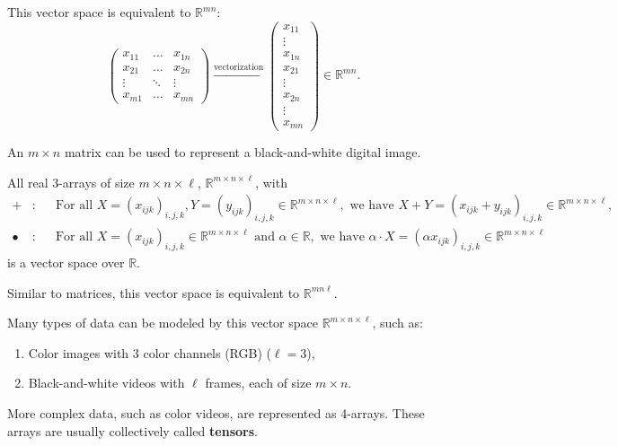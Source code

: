 \documentclass{huhtakm-template-book-v2}
\begin{document}
    \begin{rem}
        This vector space is equivalent to $\mathbb{R}^{mn}$:
        \begin{equation*}
            \begin{pmatrix}
                x_{11} & \hdots & x_{1n}\\
                x_{21} & \hdots & x_{2n}\\
                \vdots & \ddots & \vdots\\
                x_{m1} & \hdots & x_{mn}
            \end{pmatrix} \xrightarrow{\text{vectorization}} \begin{pmatrix}
                x_{11}\\\vdots\\x_{1n}\\x_{21}\\\vdots\\x_{2n}\\\vdots\\x_{mn}
            \end{pmatrix} \in \mathbb{R}^{mn}.
        \end{equation*}
    \end{rem}
    \begin{rem}
        An $m \times n$ matrix can be used to represent a black-and-white digital image.
    \end{rem}
    \begin{eg}
        All real 3-arrays of size $m \times n \times \ell$, $\mathbb{R}^{m \times n \times \ell}$, with
        \begin{align*}
            +&: & &\text{For all } X = (x_{ijk})_{i,j,k}, Y = (y_{ijk})_{i,j,k} \in \mathbb{R}^{m \times n \times \ell}, \text{ we have } X + Y = (x_{ijk} + y_{ijk})_{i,j,k} \in \mathbb{R}^{m \times n \times \ell},\\
            \bullet&: & &\text{For all } X = (x_{ijk})_{i,j,k} \in \mathbb{R}^{m \times n \times \ell} \text{ and } \alpha \in \mathbb{R}, \text{ we have } \alpha \cdot X = (\alpha x_{ijk})_{i,j,k} \in \mathbb{R}^{m \times n \times \ell}
        \end{align*}
        is a vector space over $\mathbb{R}$.
    \end{eg}
    \begin{rem}
        Similar to matrices, this vector space is equivalent to $\mathbb{R}^{mn\ell}$.
    \end{rem}
    \begin{rem}
        Many types of data can be modeled by this vector space $\mathbb{R}^{m \times n \times \ell}$, such as:
        \begin{enumerate}
            \item Color images with 3 color channels (RGB) ($\ell = 3$),
            \item Black-and-white videos with $\ell$ frames, each of size $m \times n$.
        \end{enumerate}
        More complex data, such as color videos, are represented as 4-arrays. These arrays are usually collectively called \textbf{tensors}.
    \end{rem}
\end{document}
